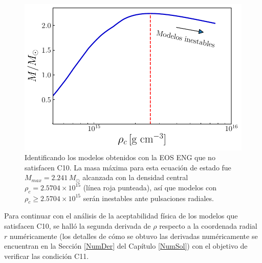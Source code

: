 \begin{figure}[H]
    \centering
    \includegraphics[width=0.7\linewidth]{figures/Mrhorel_eng.pdf}
    \caption[Identificando los modelos obtenidos con la EOS ENG que no satisfacen C10]{Identificando los modelos obtenidos con la EOS ENG que no satisfacen C10. La masa máxima para esta ecuación de estado fue $M_{max}=2.241\,M_{\odot}$ alcanzada con la densidad central $\rho_c=2.5704 \times 10^{15}$ (línea roja punteada), así que modelos con $\rho_c \geq 2.5704 \times 10^{15}$ serán inestables ante pulsaciones radiales. }
    \label{mrhoeng}
\end{figure}
Para continuar con el análisis de la aceptabilidad física de los modelos que satisfacen C10, se halló la segunda derivada de $\rho$ respecto a la coordenada radial $r$ numéricamente (los detalles de cómo se obtuvo las derivadas numéricamente se encuentran en la Sección \ref{NumDer} del Capítulo \ref{NumSol}) con el objetivo de verificar las condición C11.  


